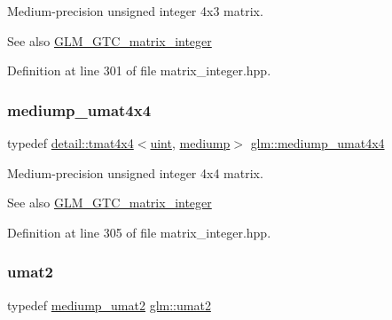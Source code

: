 Medium-\/precision unsigned integer 4x3 matrix. \begin{DoxySeeAlso}{See also}
\hyperlink{group__gtc__matrix__integer}{G\+L\+M\+\_\+\+G\+T\+C\+\_\+matrix\+\_\+integer} 
\end{DoxySeeAlso}


Definition at line 301 of file matrix\+\_\+integer.\+hpp.

\mbox{\label{group__gtc__matrix__integer_ga24b1c76fefa58f810e24cafe0ea6a6a0}} 
\subsubsection{\texorpdfstring{mediump\+\_\+umat4x4}{mediump\_umat4x4}}
{\footnotesize\ttfamily typedef \hyperlink{structglm_1_1detail_1_1tmat4x4}{detail\+::tmat4x4}$<$\hyperlink{group__core__precision_ga4fd29415871152bfb5abd588334147c8}{uint}, \hyperlink{namespaceglm_a0f04f086094c747d227af4425893f545a6416f3ea0c9025fb21ed50c4d6620482}{mediump}$>$ \hyperlink{group__gtc__matrix__integer_ga24b1c76fefa58f810e24cafe0ea6a6a0}{glm\+::mediump\+\_\+umat4x4}}

Medium-\/precision unsigned integer 4x4 matrix. \begin{DoxySeeAlso}{See also}
\hyperlink{group__gtc__matrix__integer}{G\+L\+M\+\_\+\+G\+T\+C\+\_\+matrix\+\_\+integer} 
\end{DoxySeeAlso}


Definition at line 305 of file matrix\+\_\+integer.\+hpp.

\mbox{\label{group__gtc__matrix__integer_gae2d45c058cfa0b60ab4df0cdda2d8516}} 
\subsubsection{\texorpdfstring{umat2}{umat2}}
{\footnotesize\ttfamily typedef \hyperlink{group__gtc__matrix__integer_ga388a5b9d7e494d5f5bd30b9e11ded06a}{mediump\+\_\+umat2} \hyperlink{group__gtc__matrix__integer_gae2d45c058cfa0b60ab4df0cdda2d8516}{glm\+::umat2}}


